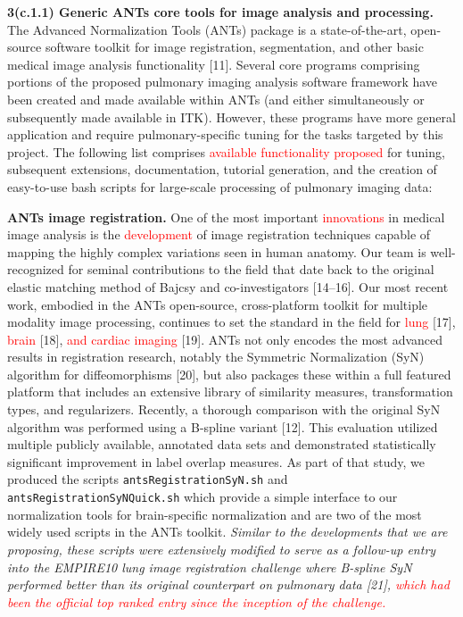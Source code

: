 \documentclass[11pt,]{article}
\begin{document}


\textbf{3(c.1.1) Generic ANTs core tools for image analysis and
processing.} The Advanced Normalization Tools (ANTs) package is a
state-of-the-art, open-source software toolkit for image registration,
segmentation, and other basic medical image analysis functionality
{[}11{]}. Several core programs comprising portions of the proposed
pulmonary imaging analysis software framework have been created and made
available within ANTs (and either simultaneously or subsequently made
available in ITK). However, these programs have more general application
and require pulmonary-specific tuning for the tasks targeted by this
project. The following list comprises
\textcolor{red}{available functionality proposed} for tuning, subsequent
extensions, documentation, tutorial generation, and the creation of
easy-to-use bash scripts for large-scale processing of pulmonary imaging
data:

\textbf{ANTs image registration.} One of the most important
\textcolor{red}{innovations} in medical image analysis is the
\textcolor{red}{development} of image registration techniques capable of
mapping the highly complex variations seen in human anatomy. Our team is
well-recognized for seminal contributions to the field that date back to
the original elastic matching method of Bajcsy and co-investigators
{[}14--16{]}. Our most recent work, embodied in the ANTs open-source,
cross-platform toolkit for multiple modality image processing, continues
to set the standard in the field for \textcolor{red}{lung} {[}17{]},
\textcolor{red}{brain} {[}18{]}, \textcolor{red}{
and cardiac imaging} {[}19{]}. ANTs not only encodes the most advanced
results in registration research, notably the Symmetric Normalization
(SyN) algorithm for diffeomorphisms {[}20{]}, but also packages these
within a full featured platform that includes an extensive library of
similarity measures, transformation types, and regularizers. Recently, a
thorough comparison with the original SyN algorithm was performed using
a B-spline variant {[}12{]}. This evaluation utilized multiple publicly
available, annotated data sets and demonstrated statistically
significant improvement in label overlap measures. As part of that
study, we produced the scripts \texttt{antsRegistrationSyN.sh} and
\texttt{antsRegistrationSyNQuick.sh} which provide a simple interface to
our normalization tools for brain-specific normalization and are two of
the most widely used scripts in the ANTs toolkit. \emph{Similar to the
developments that we are proposing, these scripts were extensively
modified to serve as a follow-up entry into the EMPIRE10 lung image
registration challenge where B-spline SyN performed better than its
original counterpart on pulmonary data {[}21{]},
\textcolor{red}{which had been the official top ranked entry since the inception of the challenge.}}
\end{document}
